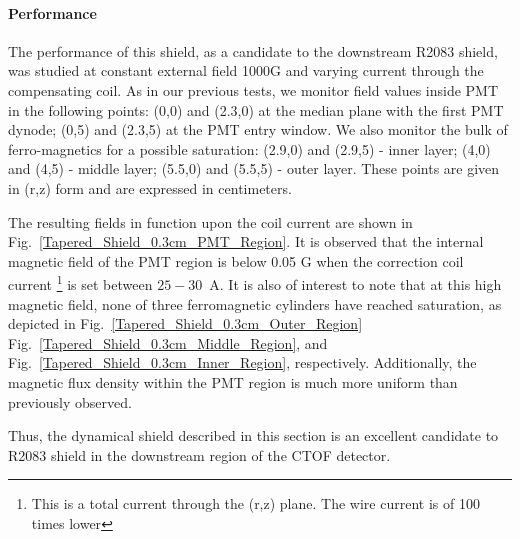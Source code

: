 \documentclass[12pt]{article}
\begin{document}
\paragraph{Performance}
The performance of this  shield, as a candidate to the downstream R2083 shield, 
was studied at constant external field 1000G and varying current through the 
compensating coil. 
As in our previous tests,  we  monitor field values inside PMT in the following  points:
 (0,0) and (2.3,0) at  the median plane with the  first PMT dynode;
           (0,5) and (2.3,5) at  the PMT entry window.
We also monitor the bulk of ferro-magnetics for a possible saturation:
(2.9,0) and (2.9,5) - inner layer; 
  (4,0) and (4,5) - middle layer; 
(5.5,0) and (5.5,5)  - outer layer.
These points are given in (r,z) form and are expressed in centimeters.


The resulting fields in function upon the coil current 
are shown in  Fig.~\ref{Tapered_Shield_0.3cm_PMT_Region}.
It is observed that the internal magnetic field of the PMT region is below 0.05 G 
when the correction coil current
\footnote{This is a total current through the (r,z) plane. The wire current is of 100 times lower}
is set between 
$25-30$~A.
It is also of interest to note that at this high magnetic field,
none of three ferromagnetic cylinders have reached saturation, as depicted in 
Fig.~\ref{Tapered_Shield_0.3cm_Outer_Region} 
Fig.~\ref{Tapered_Shield_0.3cm_Middle_Region},
and Fig.~\ref{Tapered_Shield_0.3cm_Inner_Region}, 
respectively.
 Additionally, the magnetic flux density within the PMT region is much more uniform
than previously observed.

Thus, the dynamical shield described in this section is an  excellent candidate 
to R2083 shield in the downstream region of the CTOF detector.



\end{document}

